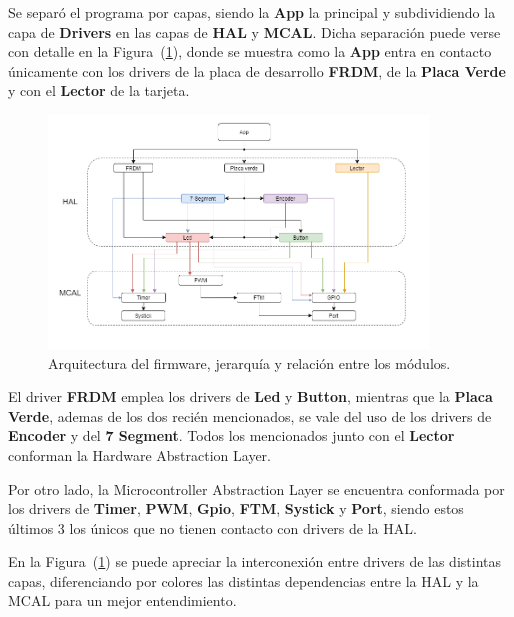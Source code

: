 Se separó el programa por capas, siendo la \textbf{App} la principal y subdividiendo la capa de \textbf{Drivers} en las capas de \textbf{HAL} y \textbf{MCAL}. Dicha separación puede verse con detalle en la Figura~(\ref{fig:drivers}), donde se muestra como la \textbf{App} entra en contacto únicamente con los drivers de la placa de desarrollo \textbf{FRDM}, de la \textbf{Placa Verde} y con el \textbf{Lector} de la tarjeta.
 
\begin{figure}[H]
\centering
	\includegraphics[width=0.9\textwidth]{ImagenesEjercicio3/esquema_drivers.png}
	\caption{Arquitectura del firmware, jerarquía y relación entre los módulos.}
	\label{fig:drivers}
\end{figure}

El driver \textbf{FRDM} emplea los drivers de \textbf{Led} y \textbf{Button}, mientras que la \textbf{Placa Verde}, ademas de los dos recién mencionados, se vale del uso de los drivers de \textbf{Encoder} y del \textbf{7 Segment}. Todos los mencionados junto con el \textbf{Lector} conforman la Hardware Abstraction Layer.

Por otro lado, la Microcontroller Abstraction Layer se encuentra conformada por los drivers de \textbf{Timer}, \textbf{PWM}, \textbf{Gpio}, \textbf{FTM}, \textbf{Systick} y \textbf{Port}, siendo estos últimos 3 los únicos que no tienen contacto con drivers de la HAL. 

En la Figura~(\ref{fig:drivers}) se puede apreciar la interconexión entre drivers de las distintas capas, diferenciando por colores las distintas dependencias entre la HAL y la MCAL para un mejor entendimiento.